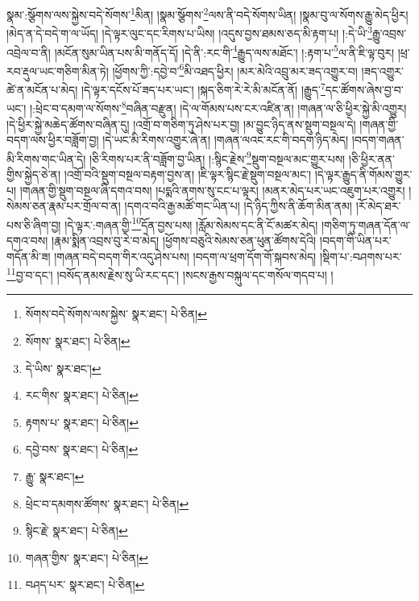 སྣམ་:སྩོགས་ལས་སྐྱེས་བདེ་སོགས་\footnote{སོགས་བདེ་སོགས་ལས་སྐྱེས་  སྣར་ཐང་།  པེ་ཅིན། }མིན། །སྣམ་སྩོགས་\footnote{སོགས་  སྣར་ཐང་།  པེ་ཅིན། }ལས་ནི་བདེ་སོགས་ཡིན། །སྣམ་བུ་ལ་སོགས་རྒྱུ་མེད་ཕྱིར། །མེད་ན་དེ་བདེ་ག་ལ་ཡོད། །དེ་ལྟར་ལུང་དང་རིགས་པ་ཡིས། །འདུས་བྱས་ཐམས་ཅད་མི་རྟག་པ། །:དེ་ཡི་\footnote{དེ་ཡིས་  སྣར་ཐང་། }རྒྱུ་འབྲས་འབྲེལ་བ་ནི། །མངོན་སུམ་ཡིན་པས་མི་གནོད་དོ། །དེ་ནི་:རང་གི་\footnote{རང་གིས་  སྣར་ཐང་།  པེ་ཅིན། }རྒྱུད་ལས་མཐོང་། །:རྟག་པ་\footnote{རྟགས་པ་  སྣར་ཐང་།  པེ་ཅིན། }ལ་ནི་ཇི་ལྟ་བུར། །ཕྲ་རབ་རྡུལ་ཡང་གཅིག་མིན་ཏེ། །ཕྱོགས་ཀྱི་:དབྱེ་བ་\footnote{དབྱེ་བས་  སྣར་ཐང་།  པེ་ཅིན། }མི་འཐད་ཕྱིར། །མར་མེའི་འབྲུ་མར་ཟད་འགྱུར་བ། །ཟད་འགྱུར་ཚེ་ན་མངོན་པ་མེད། །དེ་ལྟར་དངོས་པོ་ཟད་པར་ཡང་། །སྐད་ཅིག་རེ་རེ་མི་མངོན་ནོ། །རྒྱུད་\footnote{རྒྱུ་  སྣར་ཐང་། }དང་ཚོགས་ཞེས་བྱ་བ་ཡང་། །:ཕྲེང་བ་དམག་ལ་སོགས་\footnote{ཕྲེང་བ་དམགས་ཚོགས་  སྣར་ཐང་།  པེ་ཅིན། }བཞིན་བརྫུན། །དེ་ལ་གོམས་པས་ངར་འཛིན་ན། །གཞན་ལ་ཅི་ཕྱིར་སྐྱེ་མི་འགྱུར། །དེ་ཕྱིར་སྐྱེ་མཆེད་ཚོགས་བཞིན་དུ། །འགྲོ་བ་གཅིག་ཏུ་ཤེས་པར་བྱ། །མ་བྱུང་ཉིད་ནས་སྡུག་བསྔལ་དེ། །གཞན་གྱི་བདག་ལས་ཕྱིར་བཟློག་བྱ། །དེ་ཡང་མི་རིགས་འགྱུར་ཞེ་ན། །གཞན་ལའང་རང་གི་བདག་ཉིད་མེད། །བདག་གཞན་མི་རིགས་གང་ཡིན་དེ། །ཅི་རིགས་པར་ནི་བཟློག་བྱ་ཡིན། །:སྙིང་རྗེས་\footnote{སྙིང་རྗེ་  སྣར་ཐང་།  པེ་ཅིན། }སྡུག་བསྔལ་མང་གྱུར་པས། །ཅི་ཕྱིར་ནན་གྱིས་སྐྱེད་ཅེ་ན། །འགྲོ་བའི་སྡུག་བསྔལ་བརྟག་བྱས་ན། །ཇི་ལྟར་སྙིང་རྗེ་སྡུག་བསྔལ་མང་། །དེ་ལྟར་རྒྱུད་ནི་གོམས་གྱུར་པ། །གཞན་གྱི་སྡུག་བསྔལ་ཞི་དགའ་བས། །པདྨའི་ནགས་སུ་ངང་པ་ལྟར། །མནར་མེད་པར་ཡང་འཇུག་པར་འགྱུར། །སེམས་ཅན་རྣམ་པར་གྲོལ་བ་ན། །དགའ་བའི་རྒྱ་མཚོ་གང་ཡིན་པ། །དེ་ཉིད་ཀྱིས་ནི་ཆོག་མིན་ནམ། །རོ་མེད་ཐར་པས་ཅི་ཞིག་བྱ། །དེ་ལྟར་:གཞན་གྱི་\footnote{གཞན་གྱིས་  སྣར་ཐང་།  པེ་ཅིན། }དོན་བྱས་པས། །རློམ་སེམས་དང་ནི་ངོ་མཚར་མེད། །གཅིག་ཏུ་གཞན་དོན་ལ་དགའ་བས། །རྣམ་སྨིན་འབྲས་བུ་རེ་བ་མེད། །ཕྱོགས་བཅུའི་སེམས་ཅན་ཕུན་ཚོགས་དེའི། །བདག་གི་ཡིན་པར་གདོན་མི་ཟ། །གཞན་བདེ་བདག་གིར་འདུ་ཤེས་པས། །བདག་ལ་ཕྲག་དོག་གོ་སྐབས་མེད། །སྡིག་པ་:བཤགས་པར་\footnote{བཤད་པར་  སྣར་ཐང་།  པེ་ཅིན། }བྱ་བ་དང་། །བསོད་ནམས་རྗེས་སུ་ཡི་རང་དང་། །སངས་རྒྱས་བསྐུལ་དང་གསོལ་གདབ་པ། །
